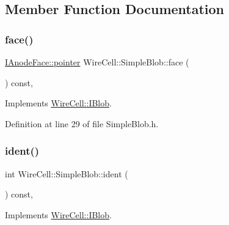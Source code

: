 \subsection{Member Function Documentation}
\mbox{\label{class_wire_cell_1_1_simple_blob_a253020b71e348b9a016ec81a86754ffd}} 
\subsubsection{\texorpdfstring{face()}{face()}}
{\footnotesize\ttfamily \hyperlink{class_wire_cell_1_1_interface_a09c548fb8266cfa39afb2e74a4615c37}{I\+Anode\+Face\+::pointer} Wire\+Cell\+::\+Simple\+Blob\+::face (\begin{DoxyParamCaption}{ }\end{DoxyParamCaption}) const\hspace{0.3cm}{\ttfamily [inline]}, {\ttfamily [virtual]}}



Implements \hyperlink{class_wire_cell_1_1_i_blob_ab67fa2e25f4d401130f09a64c4e3924a}{Wire\+Cell\+::\+I\+Blob}.



Definition at line 29 of file Simple\+Blob.\+h.

\mbox{\label{class_wire_cell_1_1_simple_blob_a0eb326289c6563bc64e2cca032022631}} 
\subsubsection{\texorpdfstring{ident()}{ident()}}
{\footnotesize\ttfamily int Wire\+Cell\+::\+Simple\+Blob\+::ident (\begin{DoxyParamCaption}{ }\end{DoxyParamCaption}) const\hspace{0.3cm}{\ttfamily [inline]}, {\ttfamily [virtual]}}



Implements \hyperlink{class_wire_cell_1_1_i_blob_a0bad6b376cf6d8880e545ee70ea12dc4}{Wire\+Cell\+::\+I\+Blob}.



